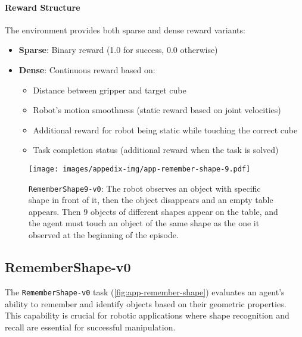 \paragraph{Reward Structure} The environment provides both sparse and dense reward variants:
\begin{itemize}
    \item \textbf{Sparse}: Binary reward (1.0 for success, 0.0 otherwise)
    \item \textbf{Dense}: Continuous reward based on:
    \begin{itemize}
        \item Distance between gripper and target cube
        \item Robot's motion smoothness (static reward based on joint velocities)
        \item Additional reward for robot being static while touching the correct cube
        \item Task completion status (additional reward when the task is solved)
    \end{itemize}
\end{itemize}


\newpage
\begin{figure*}[h!]
    \centering
    \texttt{[image: images/appedix-img/app-remember-shape-9.pdf]}
    \vspace{-15pt}
    \caption{\texttt{RememberShape9-v0}: The robot observes an object with specific shape in front of it, then the object disappears and an empty table appears. Then 9 objects of different shapes appear on the table, and the agent must touch an object of the same shape as the one it observed at the beginning of the episode.}
    \label{fig:app-remember-shape}
    \vspace{-15pt}
\end{figure*}
\subsection{RememberShape-v0}
\label{app:remember-shape}

The \texttt{RememberShape-v0} task (\autoref{fig:app-remember-shape}) evaluates an agent's ability to remember and identify objects based on their geometric properties. This capability is crucial for robotic applications where shape recognition and recall are essential for successful manipulation.

